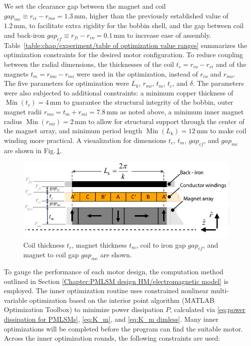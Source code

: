    
    We set the clearance gap between the magnet and coil $gap_{mc}\equiv r_{ci}-r_{mo} = 1.3\,\mathrm{mm}$, higher than the previously established value of $1.2\,\mathrm{mm}$,  to facilitate extra rigidity for the bobbin shell, and the gap between coil and back-iron $gap_{cf}\equiv r_{fi}-r_{co} = 0.1\,\mathrm{mm}$ to increase ease of assembly. Table~\ref{table:chap/experiment/table of optimization value ranges} summarizes the optimization constraints for the desired motor configuration. To reduce coupling between the radial dimensions, the thicknesses of the coil $t_c = r_{co} - r_{ci}$ and of the magnets $t_m = r_{mo} - r_{mi}$ were used in the optimization, instead of $r_{co}$ and $r_{mo}$. The five parameters for optimization were $L_k$, $r_{mi}$, $t_m$, $t_c$, and $\delta$. The parameters were also subjected to additional constraints: a minimum copper thickness of $\operatorname{Min}(t_c) = 4\,\mathrm{mm}$ to guarantee the structural integrity of the bobbin, outer magnet radii $r_{mo} = t_m + r_{mi} = 7.8\,\mathrm{mm}$ as noted above, a minimum inner magnet radius $\operatorname{Min}(r_{mi} ) = 2\,\mathrm{mm}$ to allow for structural support through the center of the magnet array, and minimum period length $\operatorname{Min}(L_k) = 12\,\mathrm{mm}$ to make coil winding more practical. A visualization for dimensions $t_c$, $t_m$, $gap_{cf}$, and $gap_{mc}$ are shown in Fig.\,\ref{fig:chap/experiment/design concept/additional_dimensions}.
    
    
    \begin{figure}[h]
        \centering
        \includegraphics[width=5.6in]{chap5/images_concept/additional_dimensions.pdf}
        \caption{Coil thickness $t_c$, magnet thickness $t_m$, coil to iron gap $gap_{cf}$, and magnet to coil gap $gap_{mc}$ are shown.}
        \label{fig:chap/experiment/design concept/additional_dimensions}
    \end{figure}
    
    
    To gauge the performance of each motor design, the computation method outlined in Section \ref{Chapter:PMLSM design HM/electromagnetic model} is employed. The inner optimization routine uses constrained nonlinear multi-variable optimization based on the interior point algorithm (MATLAB Optimization Toolbox) to minimize power dissipation $P$, calculated via \eqref{eq:power dissipation for PMLSMs}, \eqref{eq:K_m}, and \eqref{eq:K_m dimless}. Many inner optimizations will be completed before the program can find the suitable motor. Across the inner optimization rounds, the following constraints are used: 
    
